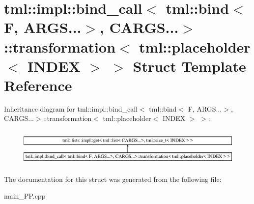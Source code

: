 \hypertarget{structtml_1_1impl_1_1bind__call_3_01tml_1_1bind_3_01F_00_01ARGS_8_8_8_4_00_01CARGS_8_8_8_4_1_1trfdcad4869966fa995f189aee681c9846}{\section{tml\+:\+:impl\+:\+:bind\+\_\+call$<$ tml\+:\+:bind$<$ F, A\+R\+G\+S...$>$, C\+A\+R\+G\+S...$>$\+:\+:transformation$<$ tml\+:\+:placeholder$<$ I\+N\+D\+E\+X $>$ $>$ Struct Template Reference}
\label{structtml_1_1impl_1_1bind__call_3_01tml_1_1bind_3_01F_00_01ARGS_8_8_8_4_00_01CARGS_8_8_8_4_1_1trfdcad4869966fa995f189aee681c9846}
}
Inheritance diagram for tml\+:\+:impl\+:\+:bind\+\_\+call$<$ tml\+:\+:bind$<$ F, A\+R\+G\+S...$>$, C\+A\+R\+G\+S...$>$\+:\+:transformation$<$ tml\+:\+:placeholder$<$ I\+N\+D\+E\+X $>$ $>$\+:\begin{figure}[H]
\begin{center}
\leavevmode
\includegraphics[height=1.898305cm]{structtml_1_1impl_1_1bind__call_3_01tml_1_1bind_3_01F_00_01ARGS_8_8_8_4_00_01CARGS_8_8_8_4_1_1trfdcad4869966fa995f189aee681c9846}
\end{center}
\end{figure}


The documentation for this struct was generated from the following file\+:\begin{DoxyCompactItemize}
\item 
main\+\_\+\+P\+P.\+cpp\end{DoxyCompactItemize}
